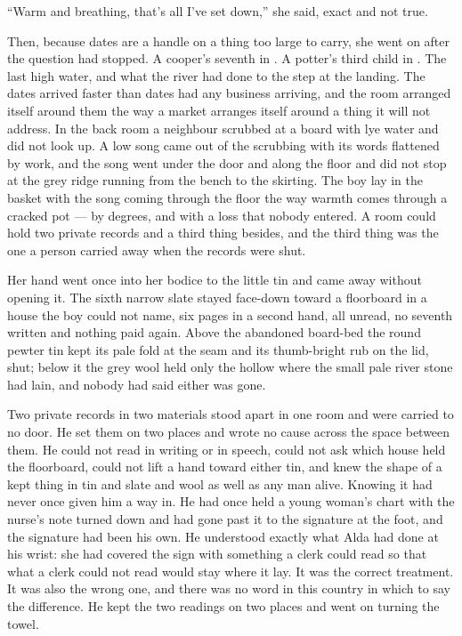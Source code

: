 “Warm and breathing, that's all I've set down,” she said, exact and not true.

Then, because dates are a handle on a thing too large to carry, she went on after the question had stopped. A cooper's seventh in . A potter's third child in . The last high water, and what the river had done to the step at the landing. The dates arrived faster than dates had any business arriving, and the room arranged itself around them the way a market arranges itself around a thing it will not address. In the back room a neighbour scrubbed at a board with lye water and did not look up. A low song came out of the scrubbing with its words flattened by work, and the song went under the door and along the floor and did not stop at the grey ridge running from the bench to the skirting. The boy lay in the basket with the song coming through the floor the way warmth comes through a cracked pot --- by degrees, and with a loss that nobody entered. A room could hold two private records and a third thing besides, and the third thing was the one a person carried away when the records were shut.

Her hand went once into her bodice to the little tin and came away without opening it. The sixth narrow slate stayed face-down toward a floorboard in a house the boy could not name, six pages in a second hand, all unread, no seventh written and nothing paid again. Above the abandoned board-bed the round pewter tin kept its pale fold at the seam and its thumb-bright rub on the lid, shut; below it the grey wool held only the hollow where the small pale river stone had lain, and nobody had said either was gone.

Two private records in two materials stood apart in one room and were carried to no door. He set them on two places and wrote no cause across the space between them. He could not read  in writing or in speech, could not ask which house held the floorboard, could not lift a hand toward either tin, and knew the shape of a kept thing in tin and slate and wool as well as any man alive. Knowing it had never once given him a way in. He had once held a young woman's chart with the nurse's note turned down and had gone past it to the signature at the foot, and the signature had been his own. He understood exactly what Alda had done at his wrist: she had covered the sign with something a clerk could read so that what a clerk could not read would stay where it lay. It was the correct treatment. It was also the wrong one, and there was no word in this country in which to say the difference. He kept the two readings on two places and went on turning the towel.


